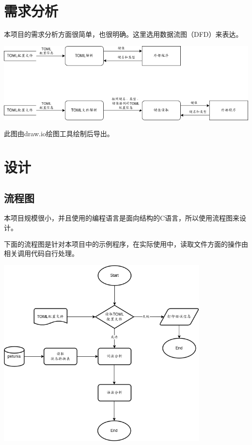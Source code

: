 \chapter{需求分析}
本项目的需求分析方面很简单，也很明确。这里选用数据流图（DFD）来表达。
\begin{center}
  \includegraphics[width=\textwidth]{images/数据流图.png}
\end{center}

此图由draw.io绘图工具绘制后导出。


\chapter{设计}


\section{流程图}
本项目规模很小，并且使用的编程语言是面向结构的C语言，所以使用流程图来设计。

下面的流程图是针对本项目中的示例程序，在实际使用中，读取文件方面的操作由相关调用代码自行处理。
\begin{center}
  \includegraphics[width=0.8\textwidth]{images/流程图.png}
\end{center}


